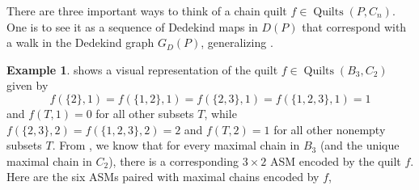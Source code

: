 \documentclass[12pt]{amsart}
\numberwithin{equation}{section}
\theoremstyle{definition}
\newtheorem{example}[theorem]{Example}
\newcommand{\quilt}{\operatorname{Quilts}}
\begin{document}
There are three important ways to think of a chain quilt $f \in
\quilt(P,C_n)$. One is to see it as a sequence of Dedekind maps in
$D(P)$ that correspond with a walk in the Dedekind graph $G_D(P)$,
generalizing .

\begin{example}\label{ex:B3.C2.quilt.and.ASMs}
 shows a visual representation of the quilt $f \in
\quilt(B_{3},C_{2})$ given by
$$f(\{2 \},1)= f(\{1,2\},1) = f(\{2,3\},1) = f(\{1,2,3\},1) = 1$$ and
$f(T,1)=0$ for all other subsets $T$, while $f(\{2,3 \},2)=f(\{1,2,3
\},2)=2$ and $f(T,2)=1$ for all other nonempty subsets $T$.   From
, we know that for every maximal chain in $B_3$
(and the unique maximal chain in $C_2$), there is a corresponding $3
\times 2$ ASM encoded by the quilt $f$.  Here are the six ASMs paired
with maximal chains encoded by $f$,
\medskip


\end{example}
\end{document}
